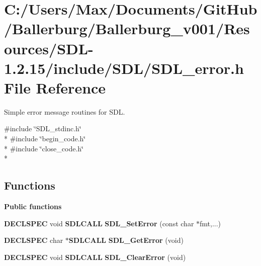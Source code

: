 \section{C\+:/\+Users/\+Max/\+Documents/\+Git\+Hub/\+Ballerburg/\+Ballerburg\+\_\+v001/\+Resources/\+S\+D\+L-\/1.2.15/include/\+S\+D\+L/\+S\+D\+L\+\_\+error.h File Reference}
\label{_s_d_l__error_8h}


Simple error message routines for S\+D\+L.  


{\ttfamily \#include \char`\"{}S\+D\+L\+\_\+stdinc.\+h\char`\"{}}\\*
{\ttfamily \#include \char`\"{}begin\+\_\+code.\+h\char`\"{}}\\*
{\ttfamily \#include \char`\"{}close\+\_\+code.\+h\char`\"{}}\\*
\subsection*{Functions}
\begin{Indent}{\bf Public functions}\par
\begin{DoxyCompactItemize}
\item 
{\bf D\+E\+C\+L\+S\+P\+E\+C} void {\bf S\+D\+L\+C\+A\+L\+L} {\bfseries S\+D\+L\+\_\+\+Set\+Error} (const char $\ast$fmt,...)\label{_s_d_l__error_8h_afde07df832effe88d483ab7015fb4c71}

\item 
{\bf D\+E\+C\+L\+S\+P\+E\+C} char $\ast${\bf S\+D\+L\+C\+A\+L\+L} {\bfseries S\+D\+L\+\_\+\+Get\+Error} (void)\label{_s_d_l__error_8h_a5151f59bab897ec9128a5ec6f9cec403}

\item 
{\bf D\+E\+C\+L\+S\+P\+E\+C} void {\bf S\+D\+L\+C\+A\+L\+L} {\bfseries S\+D\+L\+\_\+\+Clear\+Error} (void)\label{_s_d_l__error_8h_a007ed517953a99a46e46be567ef5609e}

\end{DoxyCompactItemize}
\end{Indent}
